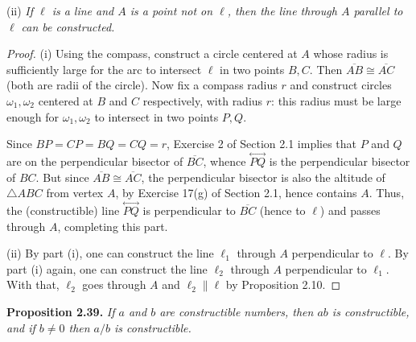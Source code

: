 \documentclass[leqno]{book}
\begin{document}
(ii) \emph{If $\ell$ is a line and $A$ is a point not on $\ell$, then the line through $A$ parallel to $\ell$ can be constructed.}
\begin{proof}
(i) Using the compass, construct a circle centered at $A$ whose radius is sufficiently large for the arc to intersect $\ell$ in two points $B,C$.  Then $\overline{AB}\cong\overline{AC}$ (both are radii of the circle).  Now fix a compass radius $r$ and construct circles $\omega_1,\omega_2$ centered at $B$ and $C$ respectively, with radius $r$: this radius must be large enough for $\omega_1,\omega_2$ to intersect in two points $P,Q$.

Since $BP=CP=BQ=CQ=r$, Exercise 2 of Section 2.1 implies that $P$ and $Q$ are on the perpendicular bisector of $\overline{BC}$, whence $\overset{\longleftrightarrow}{PQ}$ is the perpendicular bisector of $BC$.  But since $\overline{AB}\cong\overline{AC}$, the perpendicular bisector is also the altitude of $\triangle ABC$ from vertex $A$, by Exercise 17(g) of Section 2.1, hence contains $A$.  Thus, the (constructible) line $\overset{\longleftrightarrow}{PQ}$ is perpendicular to $\overline{BC}$ (hence to $\ell$) and passes through $A$, completing this part.

(ii) By part (i), one can construct the line $\ell_1$ through $A$ perpendicular to $\ell$.  By part (i) again, one can construct the line $\ell_2$ through $A$ perpendicular to $\ell_1$.  With that, $\ell_2$ goes through $A$ and $\ell_2\parallel\ell$ by Proposition 2.10.
\end{proof}
\noindent\textbf{Proposition 2.39.} \emph{If $a$ and $b$ are constructible numbers, then $ab$ is constructible, and if $b\ne 0$ then $a/b$ is constructible.}
\end{document}
